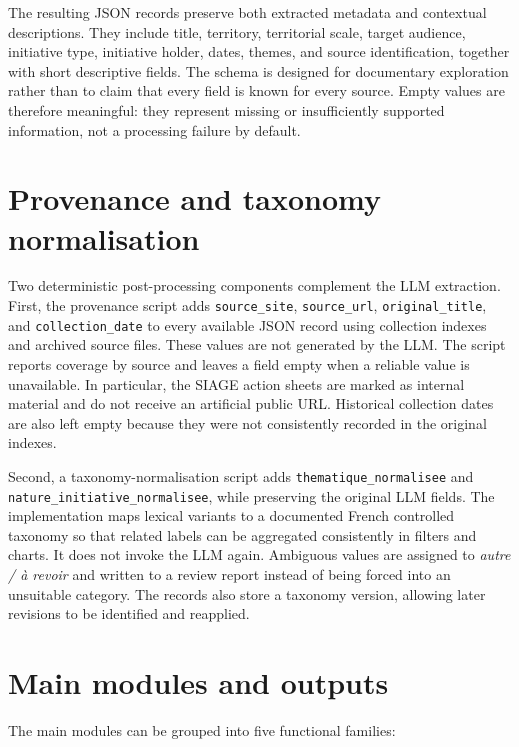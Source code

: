The resulting JSON records preserve both extracted metadata and contextual
descriptions. They include title, territory, territorial scale, target
audience, initiative type, initiative holder, dates, themes, and source
identification, together with short descriptive fields. The schema is designed
for documentary exploration rather than to claim that every field is known for
every source. Empty values are therefore meaningful: they represent missing or
insufficiently supported information, not a processing failure by default.

\section{Provenance and taxonomy normalisation}

Two deterministic post-processing components complement the LLM extraction.
First, the provenance script adds \texttt{source\_site}, \texttt{source\_url},
\texttt{original\_title}, and \texttt{collection\_date} to every available JSON
record using collection indexes and archived source files. These values are not
generated by the LLM. The script reports coverage by source and leaves a field
empty when a reliable value is unavailable. In particular, the SIAGE action
sheets are marked as internal material and do not receive an artificial public
URL. Historical collection dates are also left empty because they were not
consistently recorded in the original indexes.

Second, a taxonomy-normalisation script adds
\texttt{thematique\_normalisee} and
\texttt{nature\_initiative\_normalisee}, while preserving the original LLM
fields. The implementation maps lexical variants to a documented French
controlled taxonomy so that related labels can be aggregated consistently in
filters and charts. It does not invoke the LLM again. Ambiguous values are
assigned to \textit{autre / à revoir} and written to a review report instead of
being forced into an unsuitable category. The records also store a taxonomy
version, allowing later revisions to be identified and reapplied.

\section{Main modules and outputs}

The main modules can be grouped into five functional families:

